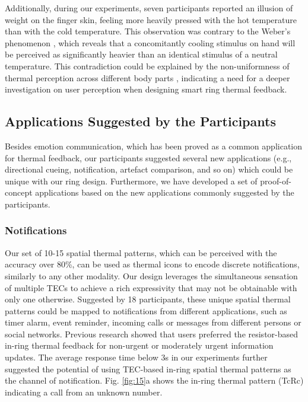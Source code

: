 \documentclass[preprint,12pt]{elsarticle}
\begin{document}
Additionally, during our experiments, seven participants reported an illusion of weight on the finger skin, feeling more heavily pressed with the hot temperature than with the cold temperature. This observation was contrary to the Weber's phenomenon \cite{4}, which reveals that a concomitantly cooling stimulus on hand will be perceived as significantly heavier than an identical stimulus of a neutral temperature. This contradiction could be explained by the non-uniformness of thermal perception across different body parts \cite{31}, indicating a need for a deeper investigation on user perception when designing smart ring thermal feedback.

\subsection{Applications Suggested by the Participants}
Besides emotion communication, which has been proved as a common application for thermal feedback, our participants suggested several new applications (e.g., directional cueing, notification, artefact comparison, and so on) which could be unique with our ring design. Furthermore, we have developed a set of proof-of-concept applications based on the new applications commonly suggested by the participants.

\subsubsection{Notifications}
Our set of 10-15 spatial thermal patterns, which can be perceived with the accuracy over 80\%, can be used as thermal icons to encode discrete notifications, similarly to any other modality. Our design leverages the simultaneous sensation of multiple TECs to achieve a rich expressivity that may not be obtainable with only one otherwise. Suggested by 18 participants, these unique spatial thermal patterns could be mapped to notifications from different applications, such as timer alarm, event reminder, incoming calls or messages from different persons or social networks. Previous research \cite{24} showed that users preferred the resistor-based in-ring thermal feedback for non-urgent or moderately urgent information updates. The average response time below 3s in our experiments further suggested the potential of using TEC-based in-ring spatial thermal patterns as the channel of notification. Fig. \ref{fig:15}a shows the in-ring thermal pattern (TcRc) indicating a call from an unknown number.
\end{document}
